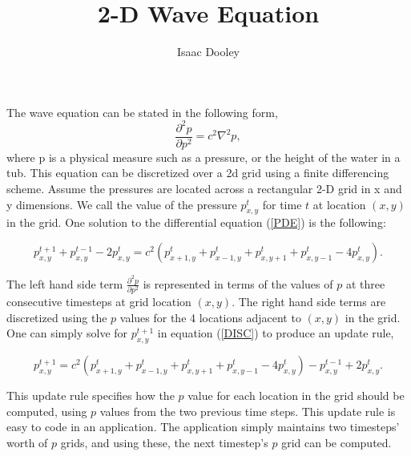 \documentclass{article}
\begin{document}
\title{2-D Wave Equation}
\author{ Isaac Dooley }



\maketitle

The wave equation can be stated in the following form, 
\begin{equation}
\frac{\partial^2p}{\partial p^2}=c^2 \nabla^2 p ,\label{PDE}
\end{equation}
where p is a physical measure such as a pressure, or the height of the water in a tub. This equation can be discretized over a 2d grid using a finite differencing scheme. Assume the pressures are located across a rectangular 2-D grid in x and y dimensions. We call the value of the pressure $p_{x,y}^{t}$ for time $t$ at location $\left(x,y\right)$ in the grid. One solution to the differential equation (\ref{PDE}) is the following:

\begin{equation}
p_{x,y}^{t+1} + p_{x,y}^{t-1} -2 p_{x,y}^{t} = c^2 \left(p_{x+1,y}^{t}+p_{x-1,y}^{t}+p_{x,y+1}^{t}+p_{x,y-1}^{t}-4p_{x,y}^{t}\right).\label{DISC}
\end{equation}

The left hand side term $\frac{\partial^2p}{\partial p^2}$ is represented in terms of the values of $p$ at three consecutive timesteps at grid location $\left(x,y\right)$. The right hand side terms are discretized using the $p$ values for the 4 locations adjacent to $\left(x,y\right)$ in the grid. One can simply solve for $p_{x,y}^{t+1}$ in equation (\ref{DISC}) to produce an update rule, 

\begin{equation}
p_{x,y}^{t+1} = c^2 \left(p_{x+1,y}^{t}+p_{x-1,y}^{t}+p_{x,y+1}^{t}+p_{x,y-1}^{t}-4p_{x,y}^{t}\right)- p_{x,y}^{t-1} +2 p_{x,y}^{t} .
\end{equation}

This update rule specifies how the $p$ value for each location in the grid should be computed, using $p$ values from the two previous time steps. This update rule is easy to code in an application. The application simply maintains two timesteps' worth of $p$ grids, and using these, the next timestep's $p$ grid can be computed.
\end{document}
